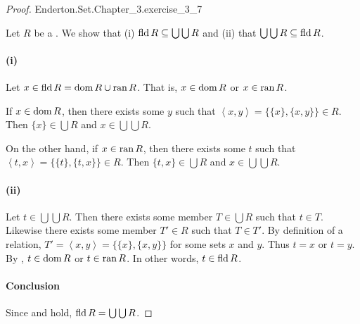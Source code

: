 \documentclass{report}
\newcommand{\pair}[1]{\left< #1 \right>}
\begin{document}
\begin{proof}

    {Enderton.Set.Chapter\_3.exercise\_3\_7}

  Let $R$ be a .
  We show that (i) $\mathop{\text{fld}}{R} \subseteq \bigcup\bigcup R$ and (ii) that
    $\bigcup\bigcup R \subseteq \mathop{\text{fld}}{R}$.

  \paragraph{(i)}%

    Let $x \in \mathop{\text{fld}}{R} = \mathop{\text{dom}}{R} \cup \mathop{\text{ran}}{R}$.
    That is, $x \in \mathop{\text{dom}}{R}$ or $x \in \mathop{\text{ran}}{R}$.

    If $x \in \mathop{\text{dom}}{R}$, then there exists some $y$ such that
      $\pair{x, y} = \{\{x\}, \{x, y\}\} \in R$.
    Then $\{x\} \in \bigcup R$ and $x \in \bigcup\bigcup R$.

    On the other hand, if $x \in \mathop{\text{ran}}{R}$, then there exists some $t$ such that
      $\pair{t, x} = \{\{t\}, \{t, x\}\} \in R$.
    Then $\{t, x\} \in \bigcup R$ and $x \in \bigcup\bigcup R$.

  \paragraph{(ii)}%

    Let $t \in \bigcup\bigcup R$.
    Then there exists some member $T \in \bigcup R$ such that $t \in T$.
    Likewise there exists some member $T' \in R$ such that $T \in T'$.
    By definition of a relation, $T' = \pair{x, y} = \{\{x\}, \{x, y\}\}$ for
      some sets $x$ and $y$.
    Thus $t = x$ or $t = y$.
    By , $t \in \mathop{\text{dom}}{R}$ or $t \in \mathop{\text{ran}}{R}$.
    In other words, $t \in \mathop{\text{fld}}{R}$.

  \paragraph{Conclusion}%

    Since  and  hold,
      $\mathop{\text{fld}}{R} = \bigcup\bigcup{R}$.

\end{proof}

\subsection{}%
\end{document}
